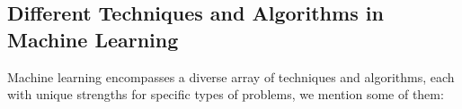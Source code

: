 

\subsection{Different Techniques and Algorithms in Machine Learning}
\label{sec:ml_techniques}
Machine learning encompasses a diverse array of techniques and algorithms, each with unique strengths for specific types of problems, we mention some of them:

